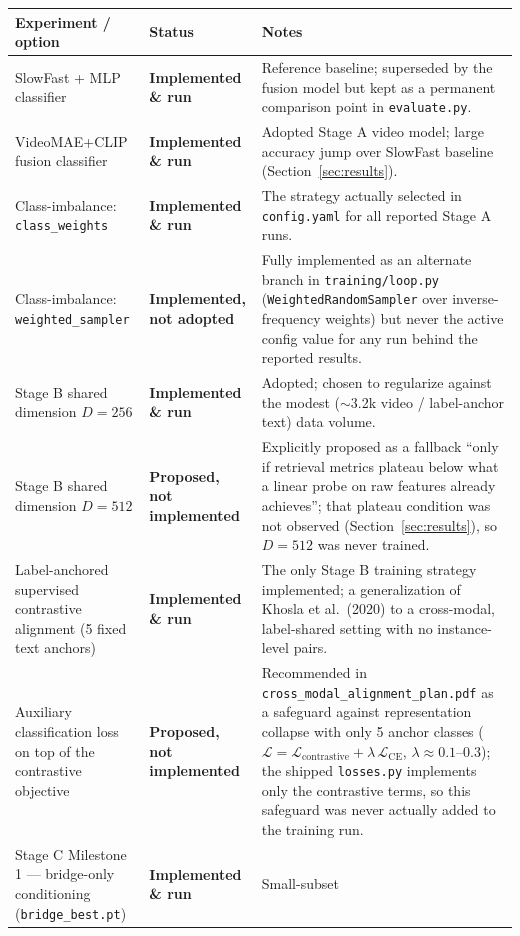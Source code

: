 \documentclass[11pt]{article}
\newcommand{\done}{\textcolor{green!45!black}{\textbf{Implemented \& run}}}
\newcommand{\altimpl}{\textcolor{orange!80!black}{\textbf{Implemented, not adopted}}}
\newcommand{\future}{\textcolor{red!60!black}{\textbf{Proposed, not implemented}}}
\begin{document}
\begin{longtable}{@{}>{\raggedright\arraybackslash}p{3.4cm} >{\raggedright\arraybackslash}p{3.0cm} >{\raggedright\arraybackslash}p{8.3cm}@{}}
\toprule
\textbf{Experiment / option} & \textbf{Status} & \textbf{Notes} \\
\midrule
\endhead
SlowFast + MLP classifier & \done & Reference baseline; superseded by the fusion model but kept as
a permanent comparison point in \texttt{evaluate.py}. \\
\addlinespace
VideoMAE+CLIP fusion classifier & \done & Adopted Stage A video model; large accuracy jump over
SlowFast baseline (Section~\ref{sec:results}). \\
\addlinespace
Class-imbalance: \texttt{class\_weights} & \done & The strategy actually selected in
\texttt{config.yaml} for all reported Stage A runs. \\
\addlinespace
Class-imbalance: \texttt{weighted\_sampler} & \altimpl & Fully implemented as an alternate branch
in \texttt{training/loop.py} (\texttt{WeightedRandomSampler} over inverse-frequency weights) but
never the active config value for any run behind the reported results. \\
\addlinespace
Stage B shared dimension $D=256$ & \done & Adopted; chosen to regularize against the modest
($\sim$3.2k video / label-anchor text) data volume. \\
\addlinespace
Stage B shared dimension $D=512$ & \future & Explicitly proposed as a fallback ``only if retrieval
metrics plateau below what a linear probe on raw features already achieves''; that plateau
condition was not observed (Section~\ref{sec:results}), so $D=512$ was never trained. \\
\addlinespace
Label-anchored supervised contrastive alignment (5 fixed text anchors) & \done & The only Stage B
training strategy implemented; a generalization of Khosla et al.\ (2020) to a cross-modal,
label-shared setting with no instance-level pairs. \\
\addlinespace
Auxiliary classification loss on top of the contrastive objective & \future & Recommended in
\texttt{cross\_modal\_alignment\_plan.pdf} as a safeguard against representation collapse with only
5 anchor classes ($\mathcal{L}=\mathcal{L}_{\text{contrastive}}+\lambda\,\mathcal{L}_{\text{CE}}$,
$\lambda\approx0.1$--$0.3$); the shipped \texttt{losses.py} implements only the contrastive terms,
so this safeguard was never actually added to the training run. \\
\addlinespace
Stage C Milestone 1 --- bridge-only conditioning (\texttt{bridge\_best.pt}) & \done & Small-subset

\end{longtable}
\end{document}
